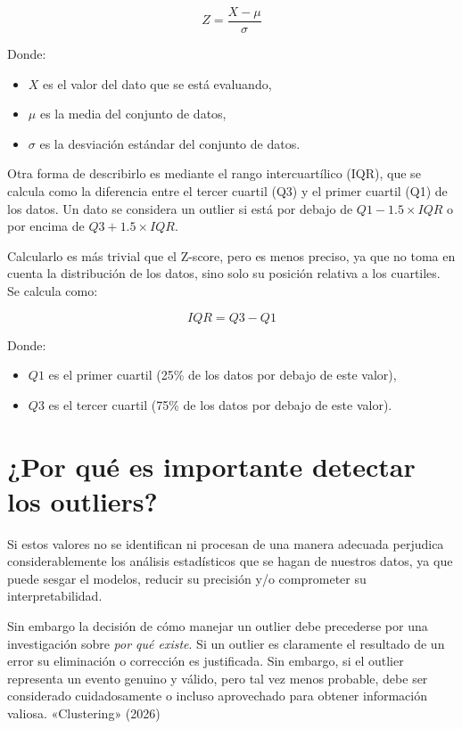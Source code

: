 \documentclass[
  spanish,
  letterpaper,
  DIV=11,
  numbers=noendperiod]{scrreprt}
\providecommand{\tightlist}{%
  \setlength{\itemsep}{0pt}\setlength{\parskip}{0pt}}
\begin{document}
\[Z = \frac{X - \mu}{\sigma}\]

Donde:

\begin{itemize}
\tightlist
\item
  \(X\) es el valor del dato que se está evaluando,
\item
  \(\mu\) es la media del conjunto de datos,
\item
  \(\sigma\) es la desviación estándar del conjunto de datos.
\end{itemize}

Otra forma de describirlo es mediante el rango intercuartílico (IQR),
que se calcula como la diferencia entre el tercer cuartil (Q3) y el
primer cuartil (Q1) de los datos. Un dato se considera un outlier si
está por debajo de \(Q1 - 1.5 \times IQR\) o por encima de
\(Q3 + 1.5 \times IQR\).

Calcularlo es más trivial que el Z-score, pero es menos preciso, ya que
no toma en cuenta la distribución de los datos, sino solo su posición
relativa a los cuartiles. Se calcula como:

\[IQR = Q3 - Q1\]

Donde:

\begin{itemize}
\tightlist
\item
  \(Q1\) es el primer cuartil (25\% de los datos por debajo de este
  valor),
\item
  \(Q3\) es el tercer cuartil (75\% de los datos por debajo de este
  valor).
\end{itemize}

\section{¿Por qué es importante detectar los
outliers?}\label{por-quuxe9-es-importante-detectar-los-outliers}

Si estos valores no se identifican ni procesan de una manera adecuada
perjudica considerablemente los análisis estadísticos que se hagan de
nuestros datos, ya que puede sesgar el modelos, reducir su precisión y/o
comprometer su interpretabilidad.

Sin embargo la decisión de cómo manejar un outlier debe precederse por
una investigación sobre \emph{por qué existe}. Si un outlier es
claramente el resultado de un error su eliminación o corrección es
justificada. Sin embargo, si el outlier representa un evento genuino y
válido, pero tal vez menos probable, debe ser considerado cuidadosamente
o incluso aprovechado para obtener información valiosa. {«Clustering»}
(2026)
\end{document}

